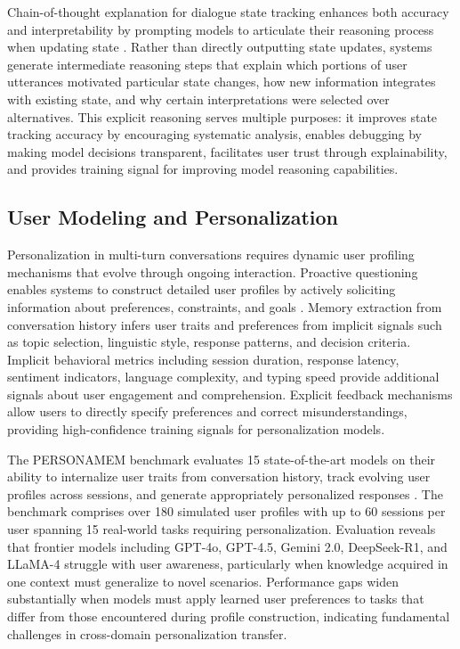 Chain-of-thought explanation for dialogue state tracking enhances both accuracy and interpretability by prompting models to articulate their reasoning process when updating state \citep{li2024chain}. Rather than directly outputting state updates, systems generate intermediate reasoning steps that explain which portions of user utterances motivated particular state changes, how new information integrates with existing state, and why certain interpretations were selected over alternatives. This explicit reasoning serves multiple purposes: it improves state tracking accuracy by encouraging systematic analysis, enables debugging by making model decisions transparent, facilitates user trust through explainability, and provides training signal for improving model reasoning capabilities.

\subsection{User Modeling and Personalization}

Personalization in multi-turn conversations requires dynamic user profiling mechanisms that evolve through ongoing interaction. Proactive questioning enables systems to construct detailed user profiles by actively soliciting information about preferences, constraints, and goals \citep{zhang2024knowme}. Memory extraction from conversation history infers user traits and preferences from implicit signals such as topic selection, linguistic style, response patterns, and decision criteria. Implicit behavioral metrics including session duration, response latency, sentiment indicators, language complexity, and typing speed provide additional signals about user engagement and comprehension. Explicit feedback mechanisms allow users to directly specify preferences and correct misunderstandings, providing high-confidence training signals for personalization models.

The PERSONAMEM benchmark evaluates 15 state-of-the-art models on their ability to internalize user traits from conversation history, track evolving user profiles across sessions, and generate appropriately personalized responses \citep{zhang2024knowme}. The benchmark comprises over 180 simulated user profiles with up to 60 sessions per user spanning 15 real-world tasks requiring personalization. Evaluation reveals that frontier models including GPT-4o, GPT-4.5, Gemini 2.0, DeepSeek-R1, and LLaMA-4 struggle with user awareness, particularly when knowledge acquired in one context must generalize to novel scenarios. Performance gaps widen substantially when models must apply learned user preferences to tasks that differ from those encountered during profile construction, indicating fundamental challenges in cross-domain personalization transfer.

